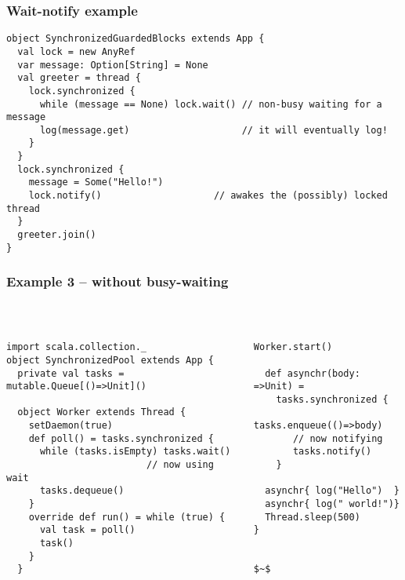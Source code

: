 \documentclass[aspectratio=169]{beamer}
\begin{document}
\begin{frame}[fragile]\frametitle{Wait-notify example}
\begin{lstlisting}[emph={sleep,log,thread,join,wait,notify,synchronized}]
object SynchronizedGuardedBlocks extends App {
  val lock = new AnyRef
  var message: Option[String] = None
  val greeter = thread {
    lock.synchronized {
      while (message == None) lock.wait() // non-busy waiting for a message
      log(message.get)                    // it will eventually log!
    }
  }
  lock.synchronized {
    message = Some("Hello!")
    lock.notify()                    // awakes the (possibly) locked thread
  }
  greeter.join()
}
\end{lstlisting}
\end{frame}


\begin{frame}[fragile]\frametitle{Example 3 -- without busy-waiting}
~\\[-8mm]
\begin{columns}
\begin{column}{0.65\textwidth}
\begin{lstlisting}[emph={printUniqueIds,sleep,log,thread,join,synchronized,wait,notify}]
import scala.collection._
object SynchronizedPool extends App {
  private val tasks = mutable.Queue[()=>Unit]()

  object Worker extends Thread {
    setDaemon(true)
    def poll() = tasks.synchronized {
      while (tasks.isEmpty) tasks.wait()
                         // now using wait
      tasks.dequeue()
    }
    override def run() = while (true) {
      val task = poll()
      task()
    }
  }
\end{lstlisting}
\end{column}
\begin{column}{0.40\textwidth}
\begin{lstlisting}[mathescape,emph={sleep,log,thread,join,synchronized,wait,notify}]
  Worker.start()

  def asynchr(body: =>Unit) =
    tasks.synchronized {
       tasks.enqueue(()=>body)
       // now notifying
       tasks.notify()
    }

  asynchr{ log("Hello")  }
  asynchr{ log(" world!")}
  Thread.sleep(500)
}


$~$
\end{lstlisting}
\end{column}
\end{columns}


\end{frame}
\end{document}
